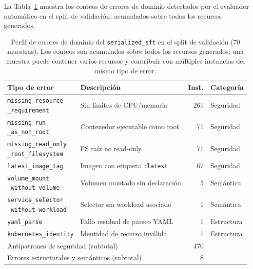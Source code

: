 La Tabla~\ref{tab:ch5_error_profile} muestra los conteos de errores de dominio detectados por
el evaluador automático en el split de validación, acumulados sobre todos los recursos generados.

\begin{table}[htbp]
\centering
\caption{Perfil de errores de dominio del \texttt{serialized\_sft} en el split de validación
         (70 muestras). Los conteos son acumulados sobre todos los recursos generados; una
         muestra puede contener varios recursos y contribuir con múltiples instancias
         del mismo tipo de error.}
\label{tab:ch5_error_profile}
\footnotesize
\setlength{\tabcolsep}{4pt}
\renewcommand{\arraystretch}{1.12}
\begin{tabular}{@{}p{}p{}rp{}@{}}
\toprule
\textbf{Tipo de error} & \textbf{Descripción} & \textbf{Inst.} & \textbf{Categoría} \\
\midrule
\shortstack[l]{\texttt{missing\_resource}\\\texttt{\_requirement}}
    & Sin límites de CPU/memoria & 261 & Seguridad \\
\shortstack[l]{\texttt{missing\_run}\\\texttt{\_as\_non\_root}}
    & Contenedor ejecutable como root & 71 & Seguridad \\
\shortstack[l]{\texttt{missing\_read\_only}\\\texttt{\_root\_filesystem}}
    & FS raíz no read-only & 71 & Seguridad \\
\texttt{latest\_image\_tag}
    & Imagen con etiqueta \texttt{:latest} & 67 & Seguridad \\
\shortstack[l]{\texttt{volume\_mount}\\\texttt{\_without\_volume}}
    & Volumen montado sin declaración & 5 & Semántica \\
\shortstack[l]{\texttt{service\_selector}\\\texttt{\_without\_workload}}
    & Selector sin workload asociado & 1 & Semántica \\
\texttt{yaml\_parse}
    & Fallo residual de parseo YAML & 1 & Estructura \\
\texttt{kubernetes\_identity}
    & Identidad de recurso inválida & 1 & Estructura \\
\midrule
\multicolumn{2}{l}{Antipatrones de seguridad (subtotal)} & 470 & \\
\multicolumn{2}{l}{Errores estructurales y semánticos (subtotal)} & 8 & \\
\bottomrule
\end{tabular}
\renewcommand{\arraystretch}{1}
\end{table}

